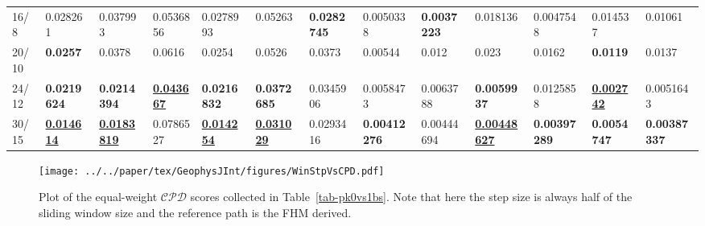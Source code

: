 \begin{landscape}
\begin{table}[]
{\begin{tabular}{@{}lllllllllllll@{}}
16/8 & 0.028261 & 0.037993 & 0.0536856 & 0.0278993 & 0.05263 & {\color[HTML]{34FF34} \textbf{0.0282745}} & 0.0050338 & {\color[HTML]{32CB00} \textbf{0.0037223}} & 0.018136 & 0.0047548 & 0.014537 & 0.01061 \\
20/10 & {\color[HTML]{34FF34} \textbf{0.0257}} & 0.0378 & 0.0616 & 0.0254 & 0.0526 & 0.0373 & 0.00544 & 0.012 & 0.023 & 0.0162 & {\color[HTML]{34FF34} \textbf{0.0119}} & 0.0137 \\
24/12 & {\color[HTML]{32CB00} \textbf{0.0219624}} & {\color[HTML]{32CB00} \textbf{0.0214394}} & {\color[HTML]{009901} {\ul\textbf{0.043667}}} & {\color[HTML]{32CB00} \textbf{0.0216832}} & {\color[HTML]{32CB00} \textbf{0.0372685}} & 0.0345906 & 0.0058473 & 0.0063788 & {\color[HTML]{32CB00} \textbf{0.0059937}} & 0.0125858 & {\color[HTML]{009901} {\ul\textbf{0.002742}}} & 0.0051643 \\
30/15 & {\color[HTML]{009901} {\ul\textbf{0.014614}}} & {\color[HTML]{009901} {\ul\textbf{0.0183819}}} & 0.0786527 & {\color[HTML]{009901} {\ul\textbf{0.014254}}} & {\color[HTML]{009901} {\ul\textbf{0.031029}}} & 0.0293416 & {\color[HTML]{34FF34} \textbf{0.00412276}} & 0.00444694 & {\color[HTML]{009901} {\ul\textbf{0.00448627}}} & {\color[HTML]{32CB00} \textbf{0.00397289}} & {\color[HTML]{32CB00} \textbf{0.0054747}} & {\color[HTML]{32CB00} \textbf{0.00387337}} \\ \bottomrule
\end{tabular}%
}
\end{table}
\end{landscape}

\begin{figure}[!ht]
  \centering
  \texttt{[image: ../../paper/tex/GeophysJInt/figures/WinStpVsCPD.pdf]}
  \caption[Sliding window and step sizes vs $\mathcal{CPD}$]{Plot of the
    equal-weight $\mathcal{CPD}$ scores collected in Table~\ref{tab-pk0vs1bs}.
    Note that here the step size is always half of the sliding window size and
    the reference path is the FHM derived.}\label{fig-WinStpVsCPD}
\end{figure}

